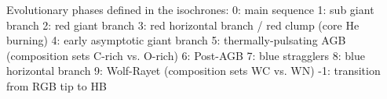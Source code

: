 Evolutionary phases defined in the isochrones:
0: main sequence
1: sub giant branch
2: red giant branch
3: red horizontal branch / red clump (core He burning)
4: early asymptotic giant branch
5: thermally-pulsating AGB (composition sets C-rich vs. O-rich)
6: Post-AGB
7: blue stragglers
8: blue horizontal branch
9: Wolf-Rayet (composition sets WC vs. WN)
-1: transition from RGB tip to HB
